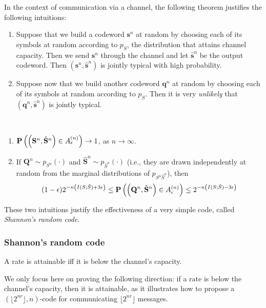 In the context of communication via a channel, the following theorem justifies the following intuitions:

\begin{enumerate}
\item Suppose that we build a codeword $\mathbf{s}^n$ at random by choosing each of its symbols at random according to $p_S$, the distribution that attains channel capacity. Then we send $\mathbf{s}^n$ through the channel and let $\hat{\mathbf{s}}^n$ be the output codeword. Then $(\mathbf{s}^n, \hat{\mathbf{s}}^n)$ is jointly typical with high probability.
\item Suppose now that we build another codeword ${\mathbf{q}}^n$ at random by choosing each of its symbols at random according to $p_S$. Then it is very \emph{unlikely} that $({\mathbf{q}}^n,\hat{\mathbf{s}}^n)$ is jointly typical.
\end{enumerate}

\begin{theorem}\mbox{  }
\begin{enumerate}
\item $\mathbf{P}\left(\left(\mathbf{S}^n, \hat{\mathbf{S}}^n\right) \in A^{(n)}_{\epsilon}\right) \to 1$, as $n \to \infty$.
\item If $\mathbf{Q}^n \sim p_{S^n}(\cdot)$ and $\hat{\mathbf{S}}^n \sim p_{\hat{S}^n}(\cdot)$ (i.e., they are drawn independently at random from the marginal distributions of $p_{S^n\hat{S}^n}$), then
%
$$(1-\epsilon)2^{-n\left(I(S;\hat{S}) + 3\epsilon\right)} \leq \mathbf{P}\left(\left({\mathbf{Q}}^n, \hat{\mathbf{S}}^n\right) \in A^{(n)}_{\epsilon}\right) \leq 2^{-n\left(I(S;\hat{S}) - 3\epsilon\right)}$$
%
\end{enumerate}
\label{thm:joint_typical}
\end{theorem}

These two intuitions justify the effectiveness of a very simple code, called \emph{Shannon's random code}. 

\subsubsection*{Shannon's random code}

\begin{theorem}
A rate is attainable iff it is below the channel's capacity.
\end{theorem}

We only focus here on proving the following direction: if a rate is below the channel's capacity, then it is attainable, as it illustrates how to propose a $(\lfloor 2^{nr} \rfloor, n)$-code for communicating $\lfloor 2^{nr} \rfloor$ messages.

